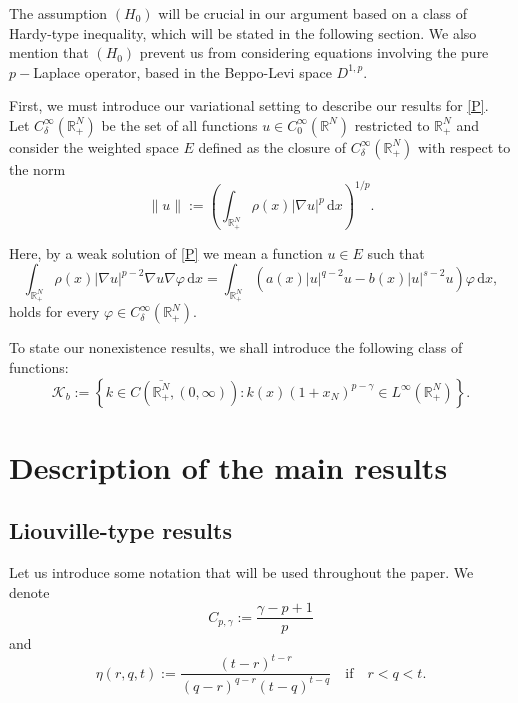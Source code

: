 \documentclass[12pt,reqno]{amsart}
\begin{document}
The assumption $(H_0)$ will be crucial in our argument based on a class of Hardy-type inequality, which will be stated in the following section. We also mention that $(H_0)$ prevent us from considering equations involving the pure $p-$Laplace operator, based in the Beppo-Levi space $D^{1,p}$.
 
First, we must introduce our variational setting to describe our results for \eqref{P}. Let $C_\delta^\infty(\mathds{R}^N_+)$ be the set of all functions $u \in C_0^\infty(\mathds{R}^N)$ restricted to $\mathds{R}^N_+$ and consider the weighted space $E$ defined as the closure of $C_\delta^\infty(\mathds{R}^N_+)$ with respect to the norm
	$$
		\|u\|:=\left(\int_{\mathds{R}^{N}_+}\rho(x)|\nabla u|^p\, \mathrm{d} x\right)^{1/p}.
	$$
 
	Here, by a weak solution of \eqref{P} we mean a function $u \in E$ such that  
	\begin{equation}\label{weak solution}
		\int_{\mathds{R}^{N}_+}\rho(x)|\nabla u|^{p-2}\nabla u \nabla \varphi \, \mathrm{d} x=\int_{\mathds{R}^{N}_+}(a(x)|u|^{q-2}u  -b(x)|u|^{s-2}u) \varphi \, \mathrm{d} x, 
	\end{equation}
	holds for every $\varphi \in C_\delta^\infty(\mathds{R}^N_+)$.
\bigskip 
 
To state our  nonexistence results, we shall introduce the following class of functions:
\begin{equation*}
 \mathcal{K}_b:=\left\{k\in C(\overline{\mathds{R}^N_+},(0,\infty)) : k(x)(1+x_N)^{p-\gamma}  \in L^{\infty}(\mathds{R}^{N}_+) \right\}.   \end{equation*}
 
\bigskip 

\section{Description of the main results}

\subsection{Liouville-type results}
Let us introduce some notation that will be used throughout the paper. We denote
$$
			C_{p,\gamma}:=\frac{\gamma-p+1}{p}
$$
  and
  \begin{equation}\label{GeneralConstant}
  \eta (r,q,t):=\frac{(t-r)^{t-r}}{(q-r)^{q-r}(t-q)^{t-q}}\quad\text{if}\quad r<q<t.
  \end{equation}
  
\end{document}
